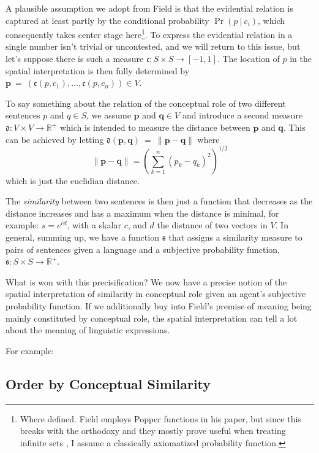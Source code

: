 \documentclass[11pt, a4paper]{article}
\renewcommand{\i}[1]{\emph{#1}}
\newcommand{\given}[1][]{\:#1\vert\:}
\begin{document}
A plausible assumption we adopt from Field is that the evidential relation is captured at least partly by the conditional probability $\Pr(p \given c_i)$, which consequently takes center stage here\footnote{Where defined. Field employs Popper functions in his paper, but since this breaks with the orthodoxy and they mostly prove useful when treating infinite sets \parencite[1352]{Leitgeb2013-LEIRBS}, I assume a classically axiomatized probability function.}. To express the evidential relation in a single number isn't trivial or uncontested, and we will return to this issue, but let's suppose there is such a measure $\mathfrak{c}: S \times S \rightarrow \left[-1,1\right]$. The location of $p$ in the spatial interpretation is then fully determined by $\mathbf{p}~=~(\mathfrak{c}({p, c_1}),\dots, \mathfrak{c}(p, c_n)) \in V$.

To say something about the relation of the conceptual role of two different sentences $p$ and $q \in S$, we assume $\mathbf{p}$ and $\mathbf{q} \in V$ and introduce a second measure $\mathfrak{d}: V \times V \rightarrow \mathbb{R}^+$ which is intended to measure the distance between $\mathbf{p}$ and $\mathbf{q}$. This can be achieved by letting $\mathfrak{d}(\mathbf{p}, \mathbf{q})~=~\lVert \mathbf{p} - \mathbf{q} \rVert$ where 
\[
    \lVert \mathbf{p}-\mathbf{q} \rVert = {\left( \sum_{k=1}^n {(p_k-q_k)}^2 \right)}^{1/2} 
\]
which is just the euclidian distance. 

The \i{similarity} between two sentences is then just a function that decreases as the distance increases and has a maximum when the distance is minimal, for example: $s = e^{cd}$, with a skalar $c$, and $d$ the distance of two vectors in $V$. In general, summing up, we have a function $\mathfrak{s}$ that assigns a similarity measure to pairs of sentences given a language and a subjective probability function, $\mathfrak{s}: S \times S \rightarrow \mathbb{R}^+$.  

What is won with this precisification? We now have a precise notion of the spatial interpretation of similarity in conceptual role given an agent's subjective probability function. If we additionally buy into Field's premise of meaning being mainly constituted by conceptual role, the spatial interpretation can tell a lot about the meaning of linguistic expressions. 

For example:

\subsection{Order by Conceptual Similarity}
\end{document}
